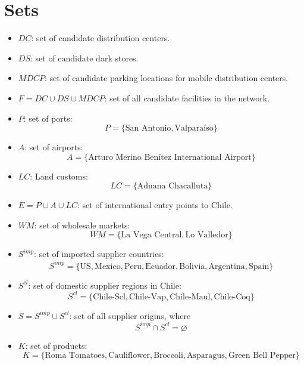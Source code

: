 \documentclass[12pt]{article}
\begin{document}
\section{Sets}
\begin{itemize}
    \item $DC$: set of candidate distribution centers.
    
    \item $DS$: set of candidate dark stores.
    
    \item $MDCP$: set of candidate parking locations for mobile distribution centers.
    
    \item $F = DC \cup DS \cup MDCP$: set of all candidate facilities in the network.
    
    \item $P$: set of ports:
    \[
    P = \{\text{San Antonio}, \text{Valparaíso}\}
    \]
    
    \item $A$: set of airports:
    \[
    A = \{\text{Arturo Merino Benítez International Airport}\}
    \]

    \item $LC$: Land customs:
    \[
    LC = \{\text{Aduana Chacalluta}\}
    \]

    \item $E = P \cup A \cup  LC$: set of international entry points to Chile.
    
    \item $WM$: set of wholesale markets:
    \[
    WM = \{\text{La Vega Central}, \text{Lo Valledor}\}
    \]
    
    \item $S^{imp}$: set of imported supplier countries:
    \[
    S^{imp} = \{\mathrm{US}, \mathrm{Mexico}, \mathrm{Peru}, \mathrm{Ecuador}, \mathrm{Bolivia}, \mathrm{Argentina}, \mathrm{Spain}\}
    \]

    \item $S^{cl}$: set of domestic supplier regions in Chile:
    \[
    S^{cl} = \{\mathrm{Chile\text{-}Scl}, \mathrm{Chile\text{-}Vap}, \mathrm{Chile\text{-}Maul}, \mathrm{Chile\text{-}Coq}\}
    \]

    \item $S = S^{imp} \cup S^{cl}$: set of all supplier origins, where
    \[
    S^{imp} \cap S^{cl} = \varnothing
    \]

    \item $K$: set of products:
    \[
    K = \{\text{Roma Tomatoes}, \text{Cauliflower}, \text{Broccoli}, \text{Asparagus}, \text{Green Bell Pepper}\}
    \]
    

\end{itemize}
\end{document}
